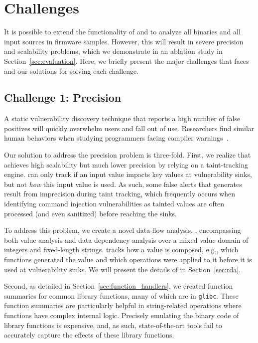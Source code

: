 \section{Challenges}
\label{sec:challenges}

It is possible to extend the functionality of \karonte and \satc to analyze all binaries and all input sources in firmware samples.
However, this will result in severe precision and scalability problems, which we demonstrate in an ablation study in Section~\ref{sec:evaluation}.
Here, we briefly present the major challenges that \mango faces and our solutions for solving each challenge.

\subsection{Challenge 1: Precision}
\label{sec:precision}

A static vulnerability discovery technique that reports a high number of false positives will quickly overwhelm users and fall out of use.
Researchers find similar human behaviors when studying programmers facing compiler warnings~\cite{kudrjavets2022unexplored}.

Our solution to address the precision problem is three-fold.
First, we realize that \satc achieves high scalability but much lower precision by relying on a taint-tracking engine.
\satc can only track if an input value impacts key values at vulnerability sinks, but not \emph{how} this input value is used.
As such, some false alerts that \satc generates result from imprecision during taint tracking, which frequently occurs when identifying command injection vulnerabilities as tainted values are often processed (and even sanitized) before reaching the sinks.

To address this problem, we create a novel data-flow analysis, \rda, encompassing both value analysis and data dependency analysis over a mixed value domain of integers and fixed-length strings.
\rda tracks how a value is composed, e.g., which functions generated the value and which operations were applied to it before it is used at vulnerability sinks.
We will present the details of \rda in Section~\ref{sec:rda}.

Second, as detailed in Section~\ref{sec:function_handlers}, we created function summaries for common library functions, many of which are in \texttt{glibc}.
These function summaries are particularly helpful in string-related operations where functions have complex internal logic.
Precisely emulating the binary code of library functions is expensive, and, as such, state-of-the-art tools fail to accurately capture the effects of these library functions.

